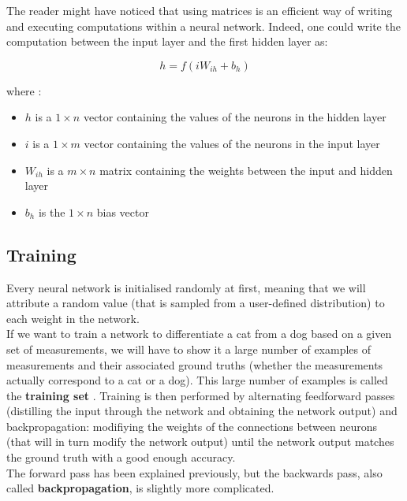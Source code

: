 The reader might have noticed that using matrices is an efficient way of writing
and executing computations within a neural network. Indeed, one could write
the computation between the input layer and the first hidden layer as: 

$$ h = f(iW_{ih} + b_h) $$

\noindent where : 
\begin{itemize}
	\item $h$ is a $1\times n$ vector containing the values of the neurons 
		in the hidden layer
	\item $i$ is a $1\times m$ vector containing the values of the neurons
		in the input layer
	\item $W_{ih}$ is a $m\times n$ matrix containing the weights between
		the input and hidden layer
	\item $b_h$ is the $1\times n$ bias vector 
\end{itemize}

\subsection{Training}
\label{nn:training}
Every neural network is initialised randomly at first, meaning that we will
attribute a random value (that is sampled from a user-defined distribution)
to each weight in the network.\\

If we want to train a network to differentiate a cat from a dog based on a
given set of measurements, we will have to show it a large number of examples
of measurements and their associated ground truths 
(whether the measurements actually correspond to a cat or a dog). This large
number of examples is called the \textbf{training set} .
Training is
then performed by alternating feedforward passes (distilling the input through
the network and obtaining the network output) and backpropagation: modifiying 
the weights of the connections between neurons (that will in turn modify 
the network output) until the network output matches the ground truth with 
a good enough accuracy.\\

The forward pass has been explained previously, but the backwards pass, also
called \textbf{backpropagation}, is slightly more complicated.\\

